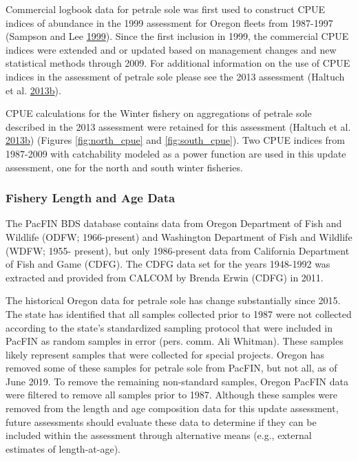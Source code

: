 \documentclass[12pt,]{article}
\begin{document}
Commercial logbook data for petrale sole was first used to construct
CPUE indices of abundance in the 1999 assessment for Oregon fleets from
1987-1997 (Sampson and Lee
\protect\hyperlink{ref-sampson_assessment_1999}{1999}). Since the first
inclusion in 1999, the commercial CPUE indices were extended and or
updated based on management changes and new statistical methods through
2009. For additional information on the use of CPUE indices in the
assessment of petrale sole please see the 2013 assessment (Haltuch et
al.
\protect\hyperlink{ref-haltuch_status_2013}{2013}\protect\hyperlink{ref-haltuch_status_2013}{b}).

CPUE calculations for the Winter fishery on aggregations of petrale sole
described in the 2013 assessment were retained for this assessment
(Haltuch et al.
\protect\hyperlink{ref-haltuch_status_2013}{2013}\protect\hyperlink{ref-haltuch_status_2013}{b})
(Figures \ref{fig:north_cpue} and \ref{fig:south_cpue}). Two CPUE
indices from 1987-2009 with catchability modeled as a power function are
used in this update assessment, one for the north and south winter
fisheries.

\subsubsection{Fishery Length and Age
Data}\label{fishery-length-and-age-data}

The PacFIN BDS database contains data from Oregon Department of Fish and
Wildlife (ODFW; 1966-present) and Washington Department of Fish and
Wildlife (WDFW; 1955- present), but only 1986-present data from
California Department of Fish and Game (CDFG). The CDFG data set for the
years 1948-1992 was extracted and provided from CALCOM by Brenda Erwin
(CDFG) in 2011.

The historical Oregon data for petrale sole has change substantially
since 2015. The state has identified that all samples collected prior to
1987 were not collected according to the state's standardized sampling
protocol that were included in PacFIN as random samples in error (pers.
comm. Ali Whitman). These samples likely represent samples that were
collected for special projects. Oregon has removed some of these samples
for petrale sole from PacFIN, but not all, as of June 2019. To remove
the remaining non-standard samples, Oregon PacFIN data were filtered to
remove all samples prior to 1987. Although these samples were removed
from the length and age composition data for this update assessment,
future assessments should evaluate these data to determine if they can
be included within the assessment through alternative means (e.g.,
external estimates of length-at-age).
\end{document}
